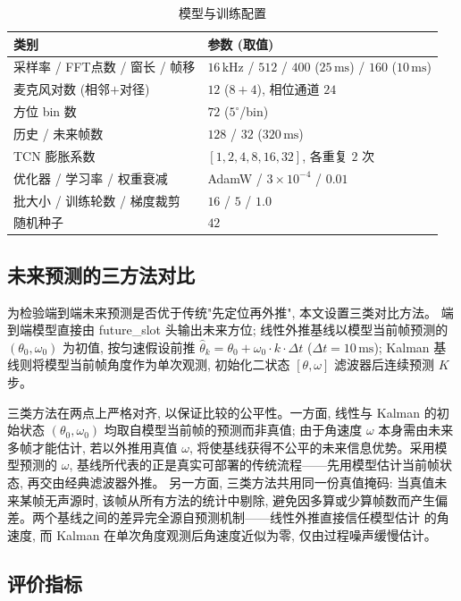 \documentclass[UTF8,a4paper,11pt]{ctexart}
\begin{document}
\begin{table}[h]
  \centering
  \caption{模型与训练配置}
  \label{tab:config}
  \begin{tabular}{ll}
    \toprule
    类别 & 参数 (取值) \\
    \midrule
    采样率 / FFT点数 / 窗长 / 帧移 & $16\,\mathrm{kHz}$ / $512$ / $400$ ($25\,\mathrm{ms}$) / $160$ ($10\,\mathrm{ms}$) \\
    麦克风对数 (相邻$+$对径) & $12$ ($8+4$), 相位通道 $24$ \\
    方位 bin 数 & $72$ ($5^\circ$/bin) \\
    历史 / 未来帧数 & $128$ / $32$ ($320\,\mathrm{ms}$) \\
    TCN 膨胀系数 & $[1,2,4,8,16,32]$, 各重复 $2$ 次 \\
    优化器 / 学习率 / 权重衰减 & AdamW / $3{\times}10^{-4}$ / $0.01$ \\
    批大小 / 训练轮数 / 梯度裁剪 & $16$ / $5$ / $1.0$ \\
    随机种子 & $42$ \\
    \bottomrule
  \end{tabular}
\end{table}

\subsection{未来预测的三方法对比}

为检验端到端未来预测是否优于传统"先定位再外推", 本文设置三类对比方法。
端到端模型直接由 future\_slot 头输出未来方位; 线性外推基线以模型当前帧预测的
$(\theta_0,\omega_0)$ 为初值, 按匀速假设前推 $\hat{\theta}_k=\theta_0+\omega_0\cdot k\cdot\Delta t$
($\Delta t{=}10\,\mathrm{ms}$); Kalman 基线则将模型当前帧角度作为单次观测, 初始化二状态
$[\theta,\omega]$ 滤波器后连续预测 $K$ 步。

三类方法在两点上严格对齐, 以保证比较的公平性。一方面, 线性与 Kalman 的初始状态
$(\theta_0,\omega_0)$ 均取自模型当前帧的预测而非真值; 由于角速度 $\omega$ 本身需由未来多帧才能估计,
若以外推用真值 $\omega$, 将使基线获得不公平的未来信息优势。采用模型预测的 $\omega$,
基线所代表的正是真实可部署的传统流程——先用模型估计当前帧状态, 再交由经典滤波器外推。
另一方面, 三类方法共用同一份真值掩码: 当真值未来某帧无声源时, 该帧从所有方法的统计中剔除,
避免因多算或少算帧数而产生偏差。两个基线之间的差异完全源自预测机制——线性外推直接信任模型估计
的角速度, 而 Kalman 在单次角度观测后角速度近似为零, 仅由过程噪声缓慢估计。

\subsection{评价指标}
\end{document}

